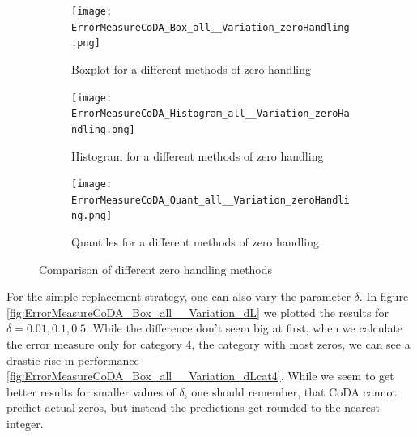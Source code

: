 \begin{figure}[htb!]
\centering
\begin{subfigure}[b]{0.45\textwidth}
\texttt{[image: ErrorMeasureCoDA\_Box\_all\_\_Variation\_zeroHandling.png]}
\caption{Boxplot for a different methods of zero handling}
\label{fig:Coda zero handling Box}
\end{subfigure}
\hfill
\begin{subfigure}[b]{0.45\textwidth}
\texttt{[image: ErrorMeasureCoDA\_Histogram\_all\_\_Variation\_zeroHandling.png]}
\caption{Histogram for a different methods of zero handling}
\label{fig:Coda zero handling Hist}
\end{subfigure}
\hfill
\begin{subfigure}[b]{0.8\textwidth}
\texttt{[image: ErrorMeasureCoDA\_Quant\_all\_\_Variation\_zeroHandling.png]}
\caption{Quantiles for a different methods of zero handling}
\label{fig:Coda zero handling Quant}
\end{subfigure}
\caption{Comparison of different zero handling methods}
\label{fig:Coda zero handling Comp1}
\end{figure}

For the simple replacement strategy, one can also vary the parameter $\delta$. In figure \ref{fig:ErrorMeasureCoDA_Box_all__Variation_dL} we plotted the results for $\delta=0.01,0.1,0.5$. While the difference don't seem big at first, when we calculate the error measure only for category 4, the category with most zeros, we can see a drastic rise in performance \ref{fig:ErrorMeasureCoDA_Box_all__Variation_dLcat4}. While we seem to get better results for smaller values of $\delta$, one should remember, that CoDA cannot predict actual zeros, but instead the predictions get rounded to the nearest integer. 


